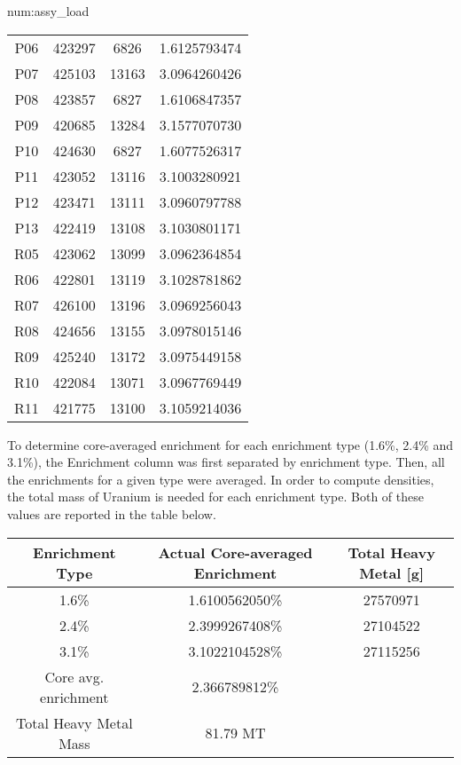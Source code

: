 \begin{numitem}{num:assy_load}
\begin{center}
\begin{longtable}{c c c c}
P06&423297&6826 &1.6125793474\\
P07&425103&13163&3.0964260426\\
P08&423857&6827 &1.6106847357\\
P09&420685&13284&3.1577070730\\
P10&424630&6827 &1.6077526317\\
P11&423052&13116&3.1003280921\\
P12&423471&13111&3.0960797788\\
P13&422419&13108&3.1030801171\\
R05&423062&13099&3.0962364854\\
R06&422801&13119&3.1028781862\\
R07&426100&13196&3.0969256043\\
R08&424656&13155&3.0978015146\\
R09&425240&13172&3.0975449158\\
R10&422084&13071&3.0967769449\\
R11&421775&13100&3.1059214036\\
    \bottomrule
  \end{longtable} \end{center}
  \raggedright
  To determine core-averaged enrichment for each enrichment type (1.6\%, 2.4\% and 3.1\%), the Enrichment column was first separated by enrichment type. Then, all the enrichments for a given type were averaged. In order to compute densities, the total mass of Uranium is needed for each enrichment type. Both of these values are reported in the table below.
   \begin{center}
  \begin{tabular}{c c c}
    \toprule
    Enrichment Type & Actual Core-averaged Enrichment & Total Heavy Metal [g] \\
    \midrule
    \midrule
 1.6\%   &    1.6100562050\% & 27570971 \\
 2.4\%   &    2.3999267408\% & 27104522  \\
 3.1\%   &    3.1022104528\% & 27115256 \\
     \midrule
     Core avg. enrichment & 2.366789812\% \\ 
     Total Heavy Metal Mass & 81.79 MT \\
    \bottomrule
  \end{tabular}
 \end{center}
\end{numitem}


